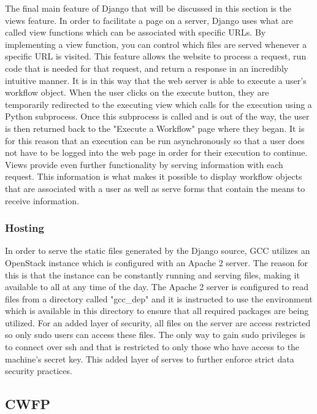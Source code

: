 \documentclass[fleqn,10pt]{SelfArx} %
\begin{document}
The final main feature of Django that will be discussed in this section is the views feature. In order to facilitate a page on a server, Django uses what are called view functions which can be associated with specific URLs. By implementing a view function, you can control which files are served whenever a specific URL is visited. This feature allows the website to process a request, run code that is needed for that request, and return a response in an incredibly intuitive manner. It is in this way that the web server is able to execute a user's workflow object. When the user clicks on the execute button, they are temporarily redirected to the executing view which calls for the execution using a Python subprocess. Once this subprocess is called and is out of the way, the user is then returned back to the "Execute a Workflow" page where they began. It is for this reason that an execution can be run asynchronously so that a user does not have to be logged into the web page in order for their execution to continue. Views provide even further functionality by serving information with each request. This information is what makes it possible to display workflow objects that are associated with a user as well as serve forms that contain the means to receive information.

\subsubsection{Hosting}

In order to serve the static files generated by the Django source, GCC utilizes an OpenStack instance which is configured with an Apache 2 server. The reason for this is that the instance can be constantly running and serving files, making it available to all at any time of the day. The Apache 2 server is configured to read files from a directory called "gcc\_dep" and it is instructed to use the environment which is available in this directory to ensure that all required packages are being utilized. For an added layer of security, all files on the server are access restricted so only sudo users can access these files. The only way to gain sudo privileges is to connect over ssh and that is restricted to only those who have access to the machine's secret key. This added layer of serves to further enforce strict data security practices.

\subsection{CWFP}
\end{document}
